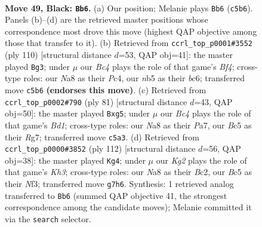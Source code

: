 \documentclass[11pt]{article}
\begin{document}
\clearpage

\begin{figure}[p]\centering
\begin{subfigure}{0.46\textwidth}\centering
\resizebox{\linewidth}{!}{%
\newchessgame
\chessboard[
  setfen={nnb5/1p4k1/8/pNbp2p1/7p/PP2P2P/3BP2K/3B4 b - - 11 49},
  showmover=false,
  pgfstyle=straightmove, color=movearrow, markmove={c5-b6}
]}
\caption{}
\end{subfigure}\hfill
\begin{subfigure}{0.46\textwidth}\centering
\resizebox{\linewidth}{!}{%
\newchessgame
\chessboard[
  setfen={8/5pk1/2b1p2p/4P2P/p1P1pBP1/8/Pb1K4/3B4 w - - 0 56},
  showmover=false,
  pgfstyle=straightmove, color=movearrow, markmove={f4-g3}
]}
\caption{}
\end{subfigure}
\\[4pt]
\begin{subfigure}{0.46\textwidth}\centering
\resizebox{\linewidth}{!}{%
\newchessgame
\chessboard[
  setfen={3bk3/pb4r1/1p1p4/1P1Pp1Pp/4P3/PK4P1/8/1NB4R b - - 4 41},
  showmover=false,
  pgfstyle=straightmove, color=movearrow, markmove={d8-g5}
]}
\caption{}
\end{subfigure}\hfill
\begin{subfigure}{0.46\textwidth}\centering
\resizebox{\linewidth}{!}{%
\newchessgame
\chessboard[
  setfen={5k2/2bb2p1/4p1n1/2p1p1P1/2P1Pp2/2BP1N1K/2B5/8 w - - 1 57},
  showmover=false,
  pgfstyle=straightmove, color=movearrow, markmove={h3-g4}
]}
\caption{}
\end{subfigure}
\caption{\textbf{Move 49, Black: \texttt{Bb6}.} (a) Our position; Melanie plays \texttt{Bb6} (\texttt{c5b6}). Panels (b)--(d) are the retrieved master positions whose correspondence most drove this move (highest QAP objective among those that transfer to it). (b) Retrieved from \texttt{ccrl\_top\_p0001\#3552} (ply 110) [structural distance $d$=53, QAP obj=41]: the master played \texttt{Bg3}; under $\mu$ our \emph{Bc4} plays the role of that game's \emph{Bf4}; cross-type roles: our \emph{N}a8 as their \emph{P}c4, our \emph{n}b5 as their \emph{b}c6; transferred move \texttt{c5b6} \textbf{(endorses this move)}. (c) Retrieved from \texttt{ccrl\_top\_p0002\#790} (ply 81) [structural distance $d$=43, QAP obj=50]: the master played \texttt{Bxg5}; under $\mu$ our \emph{Bc4} plays the role of that game's \emph{Bd1}; cross-type roles: our \emph{N}a8 as their \emph{P}a7, our \emph{B}c5 as their \emph{R}g7; transferred move \texttt{c5a3}. (d) Retrieved from \texttt{ccrl\_top\_p0000\#3852} (ply 112) [structural distance $d$=56, QAP obj=38]: the master played \texttt{Kg4}; under $\mu$ our \emph{Kg2} plays the role of that game's \emph{Kh3}; cross-type roles: our \emph{N}a8 as their \emph{B}c2, our \emph{B}c5 as their \emph{N}f3; transferred move \texttt{g7h6}. Synthesis: 1 retrieved analog transferred to \texttt{Bb6} (summed QAP objective 41, the strongest correspondence among the candidate moves); Melanie committed it via the \texttt{search} selector.}
\label{fig:thought-m97}
\end{figure}
\end{document}
